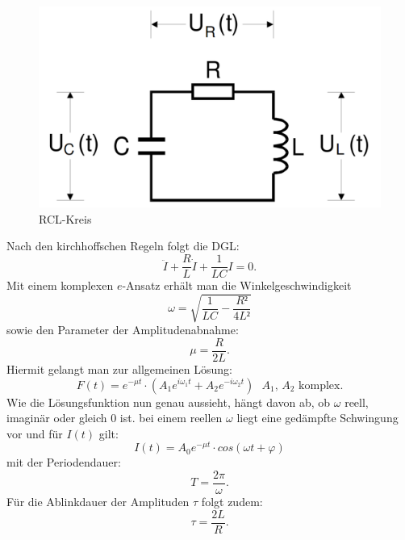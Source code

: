  \begin{figure}[H]
   \centering
   \includegraphics[width=\linewidth-200pt,height=\textheight-200pt,keepaspectratio]{content/RCL.png}
   \caption{RCL-Kreis}
   \label{fig:RCL_Kreis}
 \end{figure}

Nach den kirchhoffschen Regeln folgt die DGL:
 \begin{equation}
   \ddot{I} + \frac{R}{L} \dot{I} + \frac{1}{LC}I = 0\text{.}
 \end{equation}
 Mit einem komplexen $e$-Ansatz erhält man die Winkelgeschwindigkeit
 \begin{equation}
   \omega = \sqrt{\frac{1}{LC}-\frac{R²}{4L²}}
 \end{equation}
 sowie den Parameter der Amplitudenabnahme:
 \begin{equation}
 \mu = \frac{R}{2L}\text{.}
 \end{equation}
 Hiermit gelangt man zur allgemeinen Lösung:
 \begin{equation}
   F(t) = e^{-\mu t} \cdot  \left( A_1e^{i\omega_1t} + A_2e^{-i\omega_2t} \right) \text{ } A_1\text{, } A_2 \text{ komplex.}
 \end{equation}
 Wie die Lösungsfunktion nun genau aussieht, hängt davon ab, ob $\omega$ reell, imaginär
  oder gleich 0 ist.
  bei einem reellen $\omega$ liegt eine gedämpfte Schwingung vor und für $I(t)$ gilt:
  \begin{equation}
    I(t) = A_0 e^{-\mu t} \cdot cos(\omega t + \varphi)
  \end{equation}
 mit der Periodendauer:
  \begin{equation}
    T = \frac{2 \pi}{\omega}\text{.}
  \end{equation}
  Für die Ablinkdauer der Amplituden $\tau$ folgt zudem:
  \begin{equation}
    \tau = \frac{2L}{R}\text{.}
  \end{equation}
  

